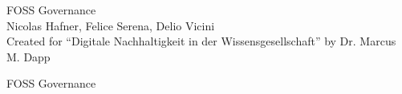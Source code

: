 \documentclass[14pt]{beamer}
\newcommand{\toptitle}[1]{
  {\huge #1} \\
  \vspace{0.2cm}
}
\begin{document}
\begin{frame}
  \begin{center}
    {\Huge FOSS Governance} \\
    \vspace{1cm}
    {\large Nicolas Hafner, Felice Serena, Delio Vicini} \\
    \vspace{2cm}
    {\small Created for ``Digitale Nachhaltigkeit in der Wissensgesellschaft'' by Dr. Marcus M. Dapp}
  \end{center}
\end{frame}

\begin{frame}
  \toptitle{FOSS Governance}
\end{frame}
\end{document}
